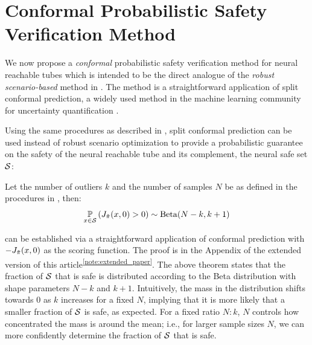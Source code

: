 \section{Conformal Probabilistic Safety Verification Method}\label{sec:conformal_method}
\vspace{-0.5em}
We now propose a \textit{conformal} probabilistic safety verification method for neural reachable tubes which is intended to be the direct analogue of the \textit{robust scenario-based} method in .
The method is a straightforward application of split conformal prediction, a widely used method in the machine learning community for uncertainty quantification \citep{MAL-101}.

Using the same procedures as described in , split conformal prediction can be used instead of robust scenario optimization to provide a probabilistic guarantee on the safety of the neural reachable tube and its complement, the neural safe set $\mathcal{S}$:
% 
\begin{theorem}
    \label{theorem:conformal_method}
    Let the number of outliers $k$ and the number of samples $N$ be as defined in the procedures in , then:
\begin{equation}\label{eq:conformal_method_theorem}
        \underset{x \in \mathcal{S}}{\mathbb{P}} \left( J_{\Tilde{\pi}}(x,0) > 0 \right) \sim \mathrm{Beta}(N-k, k+1)
    \end{equation}
\end{theorem}
% 
 can be established via a straightforward application of conformal prediction with $-J_{\Tilde{\pi}}(x,0)$ as the scoring function. 
The proof is in the Appendix of the extended version of this article\textsuperscript{\ref{note:extended_paper}}. 
The above theorem states that the fraction of $\mathcal{S}$ that is safe is distributed according to the Beta distribution with shape parameters $N-k$ and $k+1$. 
Intuitively, the mass in the distribution shifts towards $0$ as $k$ increases for a fixed $N$, implying that it is more likely that a smaller fraction of $\mathcal{S}$ is safe, as expected.
For a fixed ratio $N:k$, $N$ controls how concentrated the mass is around the mean; i.e., for larger sample sizes $N$, we can more confidently determine the fraction of $\mathcal{S}$ that is safe.


